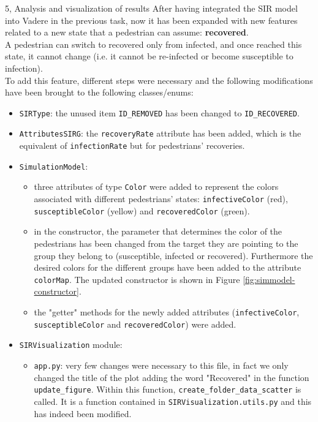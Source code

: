 \documentclass[10pt,a4paper]{article}
\begin{document}
\begin{task}{5, Analysis and visualization of results}
After having integrated the SIR model into Vadere in the previous task, now it has been expanded with new features related to a new state that a pedestrian can assume: \textbf{recovered}.\\
A pedestrian can switch to recovered only from infected, and once reached this state, it cannot change (i.e. it cannot be re-infected or become susceptible to infection).\\
To add this feature, different steps were necessary and the following modifications have been brought to the following classes/enums:
\begin{itemize}
    \item \texttt{SIRType}:
    the unused item \texttt{ID\_REMOVED} has been changed to \texttt{ID\_RECOVERED}.
    
    \item \texttt{AttributesSIRG}:
    the \texttt{recoveryRate} attribute has been added, which is the equivalent of \texttt{infectionRate} but for pedestrians' recoveries.
    
    \item \texttt{SimulationModel}:
    \begin{itemize}
        \item three attributes of type \texttt{Color} were added to represent the colors associated with different pedestrians' states: \texttt{infectiveColor} (red), \texttt{susceptibleColor} (yellow) and \texttt{recoveredColor} (green).
        
        \item in the constructor, the parameter that determines the color of the pedestrians has been changed from the target they are pointing to the group they belong to (susceptible, infected or recovered).
        Furthermore the desired colors for the different groups have been added to the attribute \texttt{colorMap}.
        The updated constructor is shown in Figure \ref{fig:simmodel-constructor}.
        
        \item the "getter" methods for the newly added attributes (\texttt{infectiveColor}, \texttt{susceptibleColor} and \texttt{recoveredColor}) were added.
    \end{itemize}
    
    \item \texttt{SIRVisualization} module:
    \begin{itemize}
        \item \texttt{app.py}:
        very few changes were necessary to this file, in fact we only changed the title of the plot adding the word "Recovered" in the function \texttt{update\_figure}.
        Within this function, \texttt{create\_folder\_data\_scatter} is called.
        It is a function contained in \texttt{SIRVisualization.utils.py} and this has indeed been modified.
        

\end{itemize}
\end{itemize}
\end{task}
\end{document}
